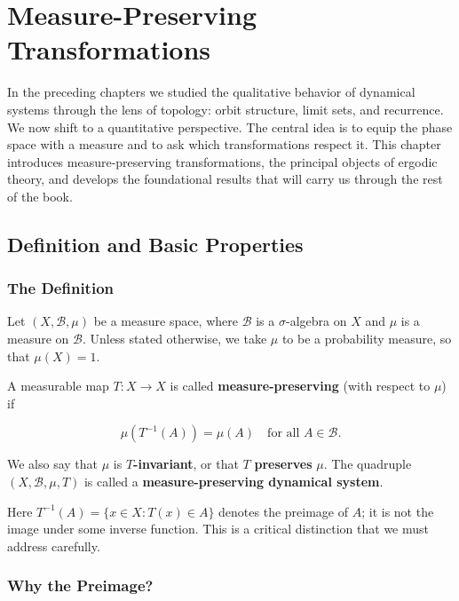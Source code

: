 \chapter{Measure-Preserving Transformations}\label{ch:8}

In the preceding chapters we studied the qualitative behavior of dynamical systems through the lens of topology: orbit structure, limit sets, and recurrence. We now shift to a quantitative perspective. The central idea is to equip the phase space with a measure and to ask which transformations respect it. This chapter introduces measure-preserving transformations, the principal objects of ergodic theory, and develops the foundational results that will carry us through the rest of the book.


\bigskip


\section{Definition and Basic Properties}\label{sec:8.1}

\subsection{The Definition}\label{sec:8.1.1}

Let $(X, \mathcal{B}, \mu)$ be a measure space, where $\mathcal{B}$ is a $\sigma$-algebra on $X$ and $\mu$ is a measure on $\mathcal{B}$. Unless stated otherwise, we take $\mu$ to be a probability measure, so that $\mu(X) = 1$.

\begin{definition}\label{def:8.1.}
A measurable map $T: X \to X$ is called \textbf{measure-preserving} (with respect to $\mu$) if

\[
\mu(T^{-1}(A)) = \mu(A) \quad \text{for all } A \in \mathcal{B}.
\]

We also say that $\mu$ is \textbf{$T$-invariant}, or that $T$ \textbf{preserves} $\mu$. The quadruple $(X, \mathcal{B}, \mu, T)$ is called a \textbf{measure-preserving dynamical system}.

Here $T^{-1}(A) = \{x \in X : T(x) \in A\}$ denotes the preimage of $A$; it is not the image under some inverse function. This is a critical distinction that we must address carefully.
\end{definition}


\subsection{Why the Preimage?}\label{sec:8.1.2}

